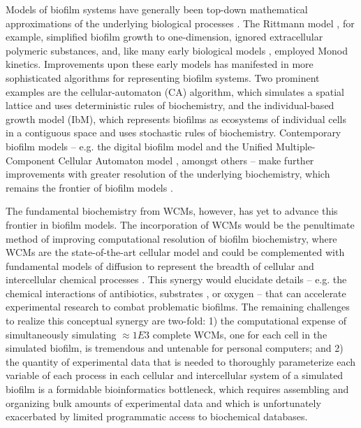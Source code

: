 Models of biofilm systems have generally been top-down mathematical approximations of the underlying biological processes \cite{Wang2010ReviewBiofilms,Lewandowski20114.15Treatment,Wanner1986AModel,Tiwari2001ModelingApplications,Tiwari1997BiofilmMedium}. The Rittmann model \cite{Suidan1987CriteriaTypes}, for example, simplified biofilm growth to one-dimension, ignored extracellular polymeric substances, and, like many early biological models \cite{Kim1989ApproximateExpression,Torres2008KineticAnode}, employed Monod kinetics. Improvements upon these early models \cite{Wanner1984CompetitionBiofilms,Gadani1993AModel} has manifested in more sophisticated algorithms for representing biofilm systems. Two prominent examples are the cellular-automaton (CA) algorithm, which simulates a spatial lattice and uses deterministic rules of biochemistry, and the individual-based growth model (IbM), which represents biofilms as ecosystems of individual cells in a contiguous space \cite{Kreft1998BacSimGrowth} and uses stochastic rules of biochemistry. Contemporary biofilm models \cite{Xavier2005Biofilm-controlStudy,DeJong2017MathematicalGrowth} -- e.g. the digital biofilm model \cite{Barai2016ModelingBehavior} and the Unified Multiple-Component Cellular Automaton model \cite{Laspidou2004EvaluatingModel}, amongst others \cite{Laspidou2014MaterialProperties,Laspidou2005FiniteBehavior} -- make further improvements with greater resolution of the underlying biochemistry, which remains the frontier of biofilm models \cite{Laspidou2010Cellular-automataCons}.

The fundamental biochemistry from WCMs, however, has yet to advance this frontier in biofilm models. The incorporation of WCMs would be the penultimate method of improving computational resolution of biofilm biochemistry, where WCMs are the state-of-the-art cellular model and could be complemented with fundamental models of diffusion \cite{Das1991AEquation} to represent the breadth of cellular and intercellular chemical processes \cite{Frederick2011ACommunities,Characklis1981MicrobialAnalysis.}. This synergy would elucidate details -- e.g. the chemical interactions of antibiotics, substrates \cite{Suidan1987CriteriaTypes}, or oxygen \cite{Lewandowski1991ReactionBiofilms} -- that can accelerate experimental research to combat problematic biofilms. The remaining challenges to realize this conceptual synergy are two-fold: 1) the computational expense of simultaneously simulating $\approx 1E3$ complete WCMs, one for each cell in the simulated biofilm, is tremendous and untenable for personal computers; and 2) the quantity of experimental data that is needed to thoroughly parameterize each variable of each process in each cellular and intercellular system of a simulated biofilm is a formidable bioinformatics bottleneck, which requires assembling and organizing bulk amounts of experimental data and which is unfortunately exacerbated by limited programmatic access to biochemical databases. 

